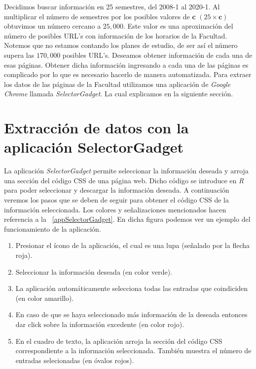 \dfNmatrizChica %

Decidimos buscar información en 25 semestres, del 2008-1 al 2020-1. Al multiplicar el número de semestres por los posibles valores de \textbf{c} $(25 \times \textbf{c})$ obtuvimos un número cercano a $25,000$. Este valor es una aproximación del número de posibles URL's con información de los horarios de la Facultad. Notemos que no estamos contando los planes de estudio, de ser así el número supera las $170,000$ posibles URL's. Deseamos obtener información de cada una de esas páginas. Obtener dicha información ingresando a cada una de las páginas es complicado por lo que es necesario hacerlo de manera automatizada. Para extraer los datos de las páginas de la Facultad utilizamos una aplicación de \textit{Google Chrome} llamada \textit{SelectorGadget}. La cual explicamos en la siguiente sección.

\section{Extracción de datos con la aplicación SelectorGadget}

La aplicación \textit{SelectorGadget} permite seleccionar la información deseada y arroja una sección del código CSS de una página web. Dicho código se introduce en \textit{R} para poder seleccionar y descargar la información deseada. A continuación veremos los pasos que se deben de seguir para obtener el código CSS de la información seleccionada. Los colores y señalizaciones mencionados hacen referencia a la \figurename{~\ref{appSelectorGadget}}. En dicha figura podemos ver un ejemplo del funcionamiento de la aplicación.

\begin{enumerate}
\item Presionar el ícono de la aplicación, el cual es una lupa (señalado por la flecha roja).

\item Seleccionar la información deseada (en color verde).

\item La aplicación automáticamente selecciona todas las entradas que coindiciden (en color amarillo).

\item En caso de que se haya seleccionado más información de la deseada entonces dar click sobre la información excedente (en color rojo).

\item  En el cuadro de texto, la aplicación arroja la sección del código CSS correspondiente a la información seleccionada. También muestra el número de entradas selecionadas (en óvalos rojos).
\end{enumerate}


